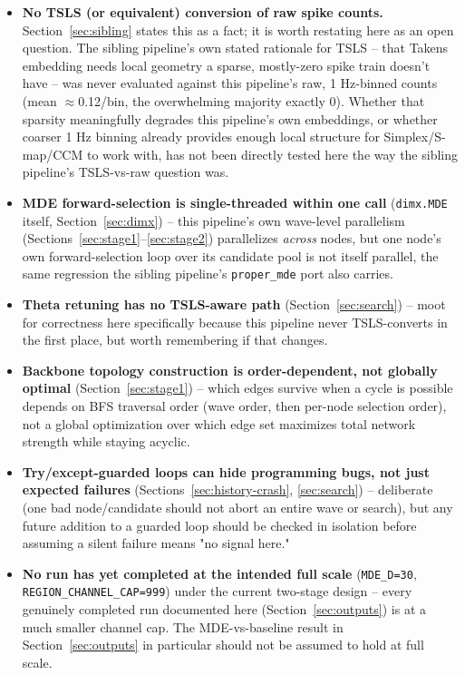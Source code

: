 \documentclass[11pt]{article}
\begin{document}
\begin{itemize}
  \item \textbf{No TSLS (or equivalent) conversion of raw spike counts.} Section~\ref{sec:sibling} states this as a fact; it is worth restating here as an open question. The sibling pipeline's own stated rationale for TSLS -- that Takens embedding needs local geometry a sparse, mostly-zero spike train doesn't have -- was never evaluated against this pipeline's raw, 1 Hz-binned counts (mean $\approx$0.12/bin, the overwhelming majority exactly 0). Whether that sparsity meaningfully degrades this pipeline's own embeddings, or whether coarser 1 Hz binning already provides enough local structure for Simplex/S-map/CCM to work with, has not been directly tested here the way the sibling pipeline's TSLS-vs-raw question was.
  \item \textbf{MDE forward-selection is single-threaded within one call} (\texttt{dimx.MDE} itself, Section~\ref{sec:dimx}) -- this pipeline's own wave-level parallelism (Sections~\ref{sec:stage1}--\ref{sec:stage2}) parallelizes \emph{across} nodes, but one node's own forward-selection loop over its candidate pool is not itself parallel, the same regression the sibling pipeline's \texttt{proper\_mde} port also carries.
  \item \textbf{Theta retuning has no TSLS-aware path} (Section~\ref{sec:search}) -- moot for correctness here specifically because this pipeline never TSLS-converts in the first place, but worth remembering if that changes.
  \item \textbf{Backbone topology construction is order-dependent, not globally optimal} (Section~\ref{sec:stage1}) -- which edges survive when a cycle is possible depends on BFS traversal order (wave order, then per-node selection order), not a global optimization over which edge set maximizes total network strength while staying acyclic.
  \item \textbf{Try/except-guarded loops can hide programming bugs, not just expected failures} (Sections~\ref{sec:history-crash}, \ref{sec:search}) -- deliberate (one bad node/candidate should not abort an entire wave or search), but any future addition to a guarded loop should be checked in isolation before assuming a silent failure means "no signal here."
  \item \textbf{No run has yet completed at the intended full scale} (\texttt{MDE\_D=30}, \texttt{REGION\_CHANNEL\_CAP=999}) under the current two-stage design -- every genuinely completed run documented here (Section~\ref{sec:outputs}) is at a much smaller channel cap. The MDE-vs-baseline result in Section~\ref{sec:outputs} in particular should not be assumed to hold at full scale.
\end{itemize}
\end{document}
